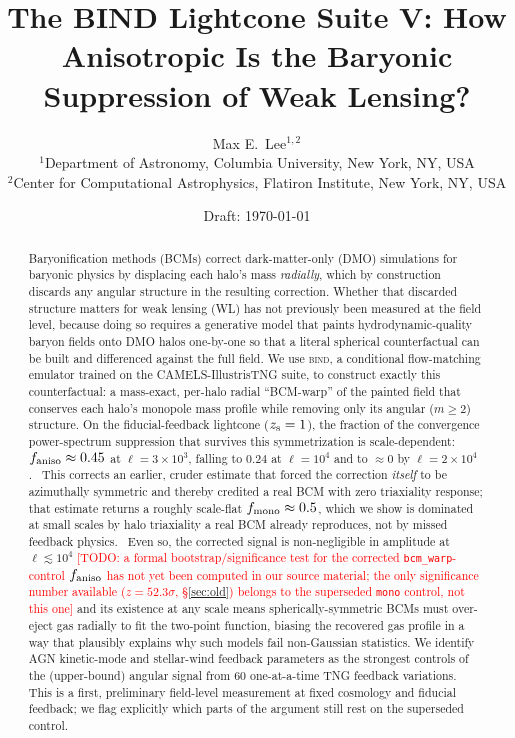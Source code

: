 \documentclass[11pt]{article}
\title{The BIND Lightcone Suite V: How Anisotropic Is the Baryonic
Suppression of Weak Lensing?}
\author{%
  Max E.\ Lee$^{1,2}$ \todo{author list to be finalized}\\[2pt]
  \small $^1$Department of Astronomy, Columbia University, New York, NY, USA\\
  \small $^2$Center for Computational Astrophysics, Flatiron Institute, New York, NY, USA
}
\date{Draft: \today}
\newcommand{\bind}{\textsc{bind}}
\newcommand{\zs}{z_{\rm s}}
\newcommand{\todo}[1]{\textcolor{red}{[TODO: #1]}}
\newcommand{\faniso}{f_{\rm aniso}}
\newcommand{\fmono}{f_{\rm mono}}
\begin{document}
\maketitle

\begin{abstract}
Baryonification methods (BCMs) correct dark-matter-only (DMO) simulations
for baryonic physics by displacing each halo's mass \emph{radially}, which
by construction discards any angular structure in the resulting correction.
Whether that discarded structure matters for weak lensing (WL) has not
previously been measured at the field level, because doing so requires a
generative model that paints hydrodynamic-quality baryon fields onto DMO
halos one-by-one so that a literal spherical counterfactual can be built
and differenced against the full field. We use \bind{}, a conditional
flow-matching emulator trained on the CAMELS-IllustrisTNG suite, to
construct exactly this counterfactual: a mass-exact, per-halo radial
``BCM-warp'' of the painted field that conserves each halo's monopole mass
profile while removing only its angular ($m\!\geq\!2$) structure. On the
fiducial-feedback lightcone ($\zs=1$), the fraction of the convergence
power-spectrum suppression that survives this symmetrization is
scale-dependent: $\faniso\approx0.45$ at $\ell=3\times10^3$, falling to
$0.24$ at $\ell=10^4$ and to $\approx0$ by $\ell=2\times10^4$.\ %
This corrects an earlier, cruder estimate that forced the correction
\emph{itself} to be azimuthally symmetric and thereby credited a real BCM
with zero triaxiality response; that estimate returns a roughly
scale-flat $\fmono\approx0.5$, which we show is dominated at small scales
by halo triaxiality a real BCM already reproduces, not by missed feedback
physics.\ %
Even so, the corrected signal is non-negligible in amplitude at
$\ell\lesssim10^4$ \todo{a formal bootstrap/significance test for the
corrected \texttt{bcm\_warp}-control $\faniso$ has not yet been computed
in our source material; the only significance number available
($z=52.3\sigma$, \S\ref{sec:old}) belongs to the superseded \texttt{mono}
control, not this one} and its existence at any scale means
spherically-symmetric BCMs must over-eject
gas radially to fit the two-point function, biasing the recovered gas
profile in a way that plausibly explains why such models fail
non-Gaussian statistics. We identify AGN kinetic-mode and stellar-wind
feedback parameters as the strongest controls of the (upper-bound) angular
signal from 60 one-at-a-time TNG feedback variations.\ %
This is a first, preliminary field-level measurement at fixed cosmology
and fiducial feedback; we flag explicitly which parts of the argument
still rest on the superseded control.
\end{abstract}
\end{document}
